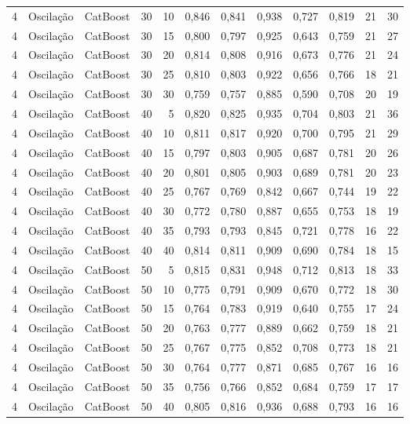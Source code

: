 \begin{longtable}{ccclrrrrrrrr}
4 & Oscilação & CatBoost & 30 & 10 & 0,846 & 0,841 & 0,938 & 0,727 & 0,819 & 21 & 30 \\
4 & Oscilação & CatBoost & 30 & 15 & 0,800 & 0,797 & 0,925 & 0,643 & 0,759 & 21 & 27 \\
4 & Oscilação & CatBoost & 30 & 20 & 0,814 & 0,808 & 0,916 & 0,673 & 0,776 & 21 & 24 \\
4 & Oscilação & CatBoost & 30 & 25 & 0,810 & 0,803 & 0,922 & 0,656 & 0,766 & 18 & 21 \\
4 & Oscilação & CatBoost & 30 & 30 & 0,759 & 0,757 & 0,885 & 0,590 & 0,708 & 20 & 19 \\
4 & Oscilação & CatBoost & 40 & 5 & 0,820 & 0,825 & 0,935 & 0,704 & 0,803 & 21 & 36 \\
4 & Oscilação & CatBoost & 40 & 10 & 0,811 & 0,817 & 0,920 & 0,700 & 0,795 & 21 & 29 \\
4 & Oscilação & CatBoost & 40 & 15 & 0,797 & 0,803 & 0,905 & 0,687 & 0,781 & 20 & 26 \\
4 & Oscilação & CatBoost & 40 & 20 & 0,801 & 0,805 & 0,903 & 0,689 & 0,781 & 20 & 23 \\
4 & Oscilação & CatBoost & 40 & 25 & 0,767 & 0,769 & 0,842 & 0,667 & 0,744 & 19 & 22 \\
4 & Oscilação & CatBoost & 40 & 30 & 0,772 & 0,780 & 0,887 & 0,655 & 0,753 & 18 & 19 \\
4 & Oscilação & CatBoost & 40 & 35 & 0,793 & 0,793 & 0,845 & 0,721 & 0,778 & 16 & 22 \\
4 & Oscilação & CatBoost & 40 & 40 & 0,814 & 0,811 & 0,909 & 0,690 & 0,784 & 18 & 15 \\
4 & Oscilação & CatBoost & 50 & 5 & 0,815 & 0,831 & 0,948 & 0,712 & 0,813 & 18 & 33 \\
4 & Oscilação & CatBoost & 50 & 10 & 0,775 & 0,791 & 0,909 & 0,670 & 0,772 & 18 & 30 \\
4 & Oscilação & CatBoost & 50 & 15 & 0,764 & 0,783 & 0,919 & 0,640 & 0,755 & 17 & 24 \\
4 & Oscilação & CatBoost & 50 & 20 & 0,763 & 0,777 & 0,889 & 0,662 & 0,759 & 18 & 21 \\
4 & Oscilação & CatBoost & 50 & 25 & 0,767 & 0,775 & 0,852 & 0,708 & 0,773 & 18 & 21 \\
4 & Oscilação & CatBoost & 50 & 30 & 0,764 & 0,777 & 0,871 & 0,685 & 0,767 & 16 & 16 \\
4 & Oscilação & CatBoost & 50 & 35 & 0,756 & 0,766 & 0,852 & 0,684 & 0,759 & 17 & 17 \\
4 & Oscilação & CatBoost & 50 & 40 & 0,805 & 0,816 & 0,936 & 0,688 & 0,793 & 16 & 16 \\

\end{longtable}
